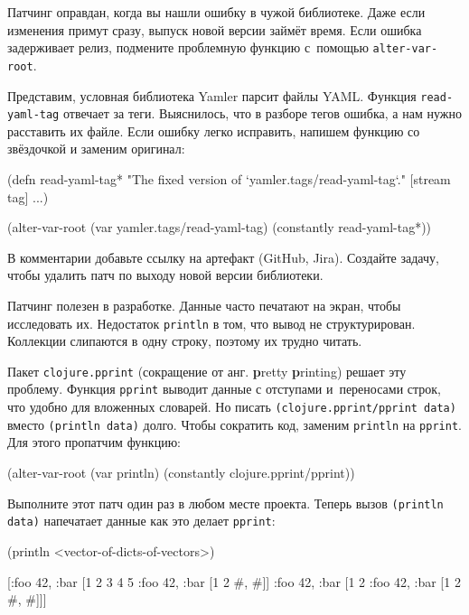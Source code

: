 Патчинг оправдан, когда вы нашли ошибку в чужой библиотеке. Даже если изменения
примут сразу, выпуск новой версии займёт время. Если ошибка задерживает релиз,
подмените проблемную функцию с~помощью \verb|alter-var-root|.

Представим, условная библиотека Yamler парсит файлы YAML. Функция
\verb|read-yaml-tag| отвечает за теги. Выяснилось, что в разборе тегов ошибка,
а нам нужно расставить их файле. Если ошибку легко исправить, напишем функцию со
звёздочкой и заменим оригинал:

\begin{english}
  \begin{clojure}
(defn read-yaml-tag*
  "The fixed version of `yamler.tags/read-yaml-tag`."
  [stream tag]
  ...)

(alter-var-root
 (var yamler.tags/read-yaml-tag)
 (constantly read-yaml-tag*))
  \end{clojure}
\end{english}

В комментарии добавьте ссылку на артефакт (GitHub, Jira). Создайте задачу,
чтобы удалить патч по выходу новой версии библиотеки.

Патчинг полезен в разработке. Данные часто печатают на экран, чтобы исследовать
их. Недостаток \verb|println| в том, что вывод не структурирован. Коллекции
слипаются в одну строку, поэтому их трудно читать.


Пакет \verb|clojure.pprint| (сокращение от анг. \textbf{p}retty \textbf{p}rinting)
решает эту проблему. Функция \verb|pprint| выводит данные с отступами и~переносами строк,
что удобно для вложенных словарей. Но писать \verb|(clojure.pprint/pprint data)|
вместо \verb|(println data)| долго. Чтобы сократить код, заменим \verb|println|
на \verb|pprint|. Для этого пропатчим функцию:

\begin{english}
  \begin{clojure}
(alter-var-root
 (var println)
 (constantly clojure.pprint/pprint))
  \end{clojure}
\end{english}

Выполните этот патч один раз в любом месте проекта. Теперь вызов
\verb|(println data)| напечатает данные как это делает \verb|pprint|:

\begin{english}
  \begin{clojure}
(println <vector-of-dicts-of-vectors>)

[{:foo 42, :bar [1 2 3 4 5 {:foo 42, :bar [1 2 {#, #}]}]}
 {:foo 42, :bar [1 2 {:foo 42, :bar [1 2 {#, #}]}]}]
  \end{clojure}
\end{english}

